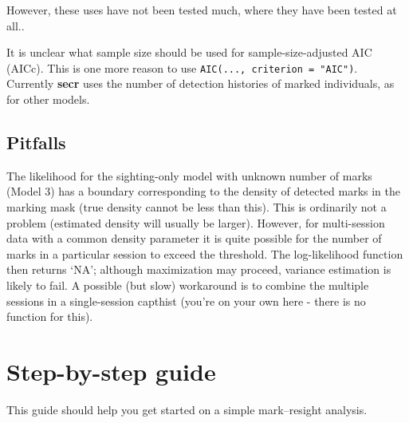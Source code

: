 \documentclass[
]{book}
\begin{document}
However, these uses have not been tested much, where they have been tested at all..

It is unclear what sample size should be used for sample-size-adjusted AIC (AICc). This is one more reason to use \texttt{AIC(...,\ criterion\ =\ "AIC")}. Currently \textbf{secr} uses the number of detection histories of marked individuals, as for other models.

\subsection{Pitfalls}\label{pitfalls}

The likelihood for the sighting-only model with unknown number of marks (Model 3) has a boundary corresponding to the density of detected marks in the marking mask (true density cannot be less than this). This is ordinarily not a problem (estimated density will usually be larger). However, for multi-session data with a common density parameter it is quite possible for the number of marks in a particular session to exceed the threshold. The log-likelihood function then returns `NA'; although maximization may proceed, variance estimation is likely to fail. A possible (but slow) workaround is to combine the multiple sessions in a single-session capthist (you're on your own here - there is no function for this).

\section{Step-by-step guide}\label{appendix1}

This guide should help you get started on a simple mark--resight analysis.
\end{document}
